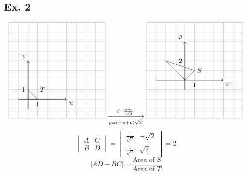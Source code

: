 \documentclass[12pt]{article}
\begin{document}
\subsection*{Ex. 2}
    \[
        \begin{tikzpicture}[scale=0.5]
            \draw[thick,->] (-1,0) -- (4,0) node[anchor=north west] {$u$};
            \draw[thick,->] (0,-1) -- (0,4) node[anchor=south east] {$v$};
            \draw[step=1cm,gray,very thin] (-2,-2) grid (8,8);
            \draw (0, 0) -- (0,1) -- (1,0) -- cycle;
            \draw (1.5,1.5) node[anchor=north]{$T$};
            \draw (1pt,1 cm) -- (-1pt,1 cm) node[anchor=east] {$1$};
            \draw (1 cm,1pt) -- (1 cm,-1pt) node[anchor=north] {$1$};
        \end{tikzpicture}
        \xrightarrow[y=(-u+v)\sqrt{2}]{x=\frac{u+v}{\sqrt{2}}}
        \begin{tikzpicture}[scale=0.5]
            \draw[thick,->] (-3,0) -- (4,0) node[anchor=north west] {$x$};
            \draw[thick,->] (0,-1) -- (0,4) node[anchor=south east] {$y$};
            \draw[step=1cm,gray,very thin] (-4,-4) grid (6,6);
            \draw (0, 0) -- (1,1) -- (-2,2) -- cycle;
            \draw (1.5,1.5) node[anchor=north]{$S$};
            \draw (1pt,2 cm) -- (-1pt,2 cm) node[anchor=east] {$2$};
            \draw (1 cm,1pt) -- (1 cm,-1pt) node[anchor=north] {$1$};
        \end{tikzpicture}
    \]
    \[ 
        \begin{vmatrix*}
            A & C \\
            B & D
        \end{vmatrix*}
        =
        \begin{vmatrix*}
            \frac{1}{\sqrt{2}} & -\sqrt{2} \\
            \frac{1}{\sqrt{2}} & \sqrt{2}
        \end{vmatrix*}
        = 2
    \]
    \[ |AD-BC| = \frac{\text{Area of $S$}}{\text{Area of $T$}} \]
\end{document}
